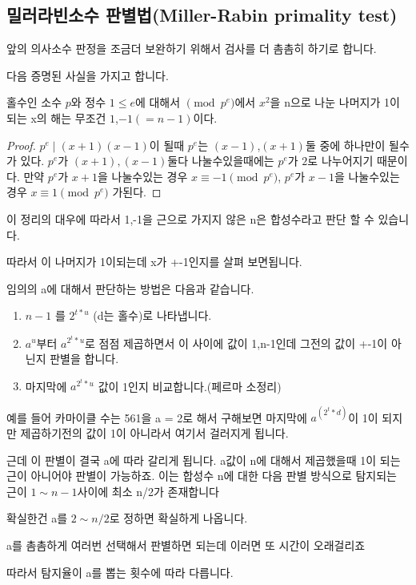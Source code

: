 \subsection{밀러라빈소수 판별법(Miller-Rabin primality test)}

앞의 의사소수 판정을 조금더 보완하기 위해서 검사를 더 촘촘히 하기로 합니다.

다음 증명된 사실을 가지고 합니다.

\begin{theorem}
    홀수인 소수 $p$와 정수 $1 \le e$에 대해서 $\pmod{p^e} $에서 $x^2$을 n으로 나눈 나머지가 1이 되는 x의 해는 무조건 $1$,$-1(=n-1)$이다.
\end{theorem}

\begin{proof}
    $p^e \mid (x+1)(x-1)$이 될때 $p^e$는 $(x-1)$,$(x+1)$둘 중에 하나만이 될수가 있다. $p^e$가 $(x+1), (x-1)$둘다 나눌수있을때에는 $p^e$가 $2$로 나누어지기 때문이다. 만약 $p^e$가 $x+1$을 나눌수있는 경우 $x \equiv -1 \pmod{p^e}$, $p^e$가 $x-1$을 나눌수있는 경우 $x \equiv 1 \pmod{p^e}$ 
    가된다.
\end{proof}
이 정리의 대우에 따라서 1,-1을 근으로 가지지 않은 n은 합성수라고 판단 할 수 있습니다.

따라서 이 나머지가 1이되는데 x가 +-1인지를 살펴 보면됩니다.

임의의 a에 대해서 판단하는 방법은 다음과 같습니다.
\begin{enumerate}
    \item $n-1$ 를  $2^{t*u}$ (d는 홀수)로 나타냅니다.
    \item $a^u$부터 $a^{2^t*u}$로 점점 제곱하면서 이 사이에 값이 1,n-1인데 그전의 값이 +-1이 아닌지 판별을 합니다.
    \item 마지막에 $a^{2^t*u}$ 값이 1인지 비교합니다.(페르마 소정리)
\end{enumerate}

예를 들어 카마이클 수는 561을 a = 2로 해서 구해보면
마지막에 $a^(2^t*d)$이 1이 되지만 제곱하기전의 값이 1이 아니라서 여기서 걸러지게 됩니다.

근데 이 판별이 결국 a에 따라 갈리게 됩니다. a값이 n에 대해서 제곱했을때 1이 되는 근이 아니어야 판별이 가능하죠. 이는 합성수 n에 대한 다음 판별 방식으로 탐지되는 근이 $1 \sim n-1$사이에 최소 n/2가 존재합니다

확실한건 a를 $2 \sim n/2$로 정하면 확실하게 나옵니다.


a를 촘촘하게 여러번 선택해서 판별하면 되는데 이러면 또 시간이 오래걸리죠

따라서 탐지율이 a를 뽑는 횟수에 따라 다릅니다.

